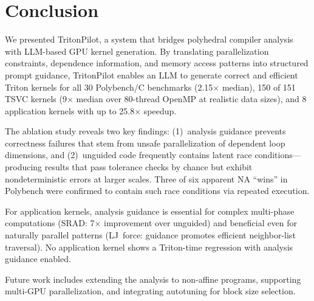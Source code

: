 \documentclass[sigconf]{acmart}
\newcommand{\sysname}{TritonPilot\xspace}
\begin{document}
\section{Conclusion}
\label{sec:conclusion}

We presented \sysname, a system that bridges polyhedral compiler
analysis with LLM-based GPU kernel generation.  By translating
parallelization constraints, dependence information, and memory access
patterns into structured prompt guidance, \sysname enables an LLM to
generate correct and efficient Triton kernels for all 30 Polybench/C
benchmarks (2.15$\times$ median), 150 of 151 TSVC kernels (9$\times$
median over 80-thread OpenMP at realistic data sizes), and 8
application kernels with up to 25.8$\times$ speedup.

The ablation study reveals two key findings: (1)~analysis guidance
prevents correctness failures that stem from unsafe parallelization
of dependent loop dimensions, and (2)~unguided code frequently contains
latent race conditions---producing results that pass tolerance checks
by chance but exhibit nondeterministic errors at larger scales.
Three of six apparent NA ``wins'' in Polybench were confirmed to
contain such race conditions via repeated execution.

For application kernels, analysis guidance is essential for
complex multi-phase computations (SRAD: 7$\times$ improvement
over unguided) and beneficial even for naturally parallel patterns
(LJ~force: guidance promotes efficient neighbor-list traversal).
No application kernel shows a Triton-time regression with analysis
guidance enabled.

Future work includes extending the analysis to non-affine programs,
supporting multi-GPU parallelization, and integrating autotuning
for block size selection.
\end{document}
